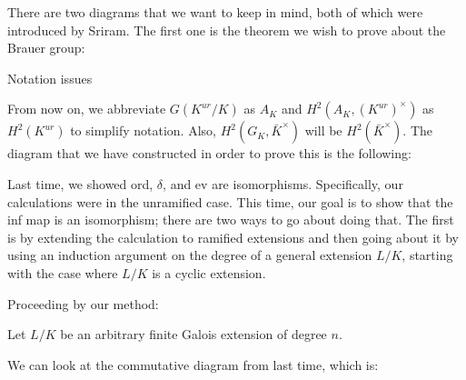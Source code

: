 \documentclass[class=article, crop=false]{standalone}
\begin{document}
There are two diagrams that we want to keep in mind, both of which were introduced by Sriram. The first one is the theorem we wish to prove about the Brauer group:


\begin{center}
\end{center}

{\color{red} Notation issues}

From now on, we abbreviate $G(K^{ur}/K)$ as $A_K$ and $H^2(A_K, (K^{ur})^\times)$ as $H^2(K^{ur})$ to simplify notation. Also, $H^2(G_K, \bar{K}^\times)$ will be $H^2(\bar{K}^\times)$. 
The diagram that we have constructed in order to prove this is the following:


\begin{center}
\end{center}

Last time, we showed ord, $\delta$, and ev are isomorphisms. 
Specifically, our calculations were in the unramified case. 
This time, our goal is to show that the inf map is an isomorphism; there are two ways to go about doing that. 
The first is by extending the calculation to ramified extensions and then going about it by using an induction argument on the degree of a general extension $L/K$, starting with the case where $L/K$ is a cyclic extension. 


Proceeding by our method:

Let $L/K$ be an arbitrary finite Galois extension of degree $n$. 

We can look at the commutative diagram from last time, which is: 
\end{document}
